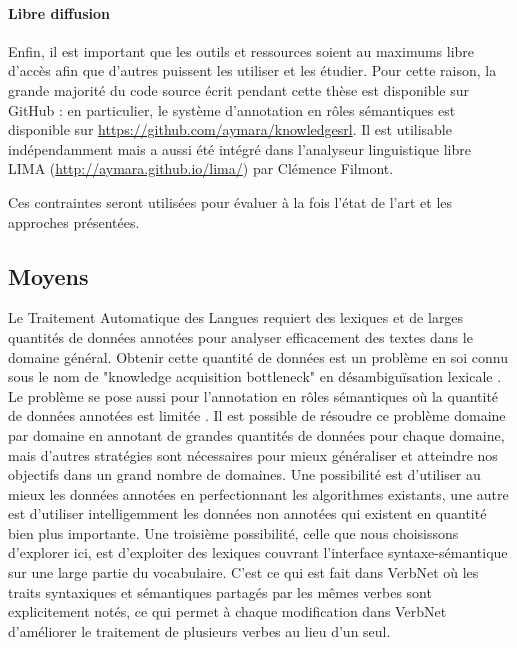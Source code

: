 \paragraph{Libre diffusion} Enfin, il est important que les outils et
ressources soient au maximums libre d'accès afin que d'autres puissent les
utiliser et les étudier. Pour cette raison, la grande majorité du code source
écrit pendant cette thèse est disponible sur GitHub : en particulier, le
système d'annotation en rôles sémantiques est disponible sur
\url{https://github.com/aymara/knowledgesrl}. Il est utilisable indépendamment
mais a aussi été intégré dans l'analyseur linguistique libre LIMA
(\url{http://aymara.github.io/lima/}) par Clémence Filmont.

Ces contraintes seront utilisées pour évaluer à la fois l'état de l'art et les
approches présentées.

\subsection{Moyens}


Le Traitement Automatique des Langues requiert des lexiques et de larges
quantités de données annotées pour analyser efficacement des textes dans le
domaine général. Obtenir cette quantité de données est un problème en soi connu
sous le nom de "knowledge acquisition bottleneck" en désambiguïsation lexicale
\citep{gale1992method,navigli2009word}. Le problème se pose aussi pour
l'annotation en rôles sémantiques où la quantité de données annotées est
limitée \citep[section 1]{das2012structure}. Il est possible de résoudre ce
problème domaine par domaine en annotant de grandes quantités de données pour
chaque domaine, mais d'autres stratégies sont nécessaires pour mieux
généraliser et atteindre nos objectifs dans un grand nombre de domaines. Une
possibilité est d'utiliser au mieux les données annotées en perfectionnant les
algorithmes existants, une autre est d'utiliser intelligemment les données non
annotées qui existent en quantité bien plus importante. Une troisième
possibilité, celle que nous choisissons d'explorer ici, est d'exploiter des
lexiques couvrant l'interface syntaxe-sémantique sur une large partie du
vocabulaire. C'est ce qui est fait dans VerbNet où les traits syntaxiques et
sémantiques partagés par les mêmes verbes sont explicitement notés, ce qui
permet à chaque modification dans VerbNet d'améliorer le traitement de
plusieurs verbes au lieu d'un seul.

